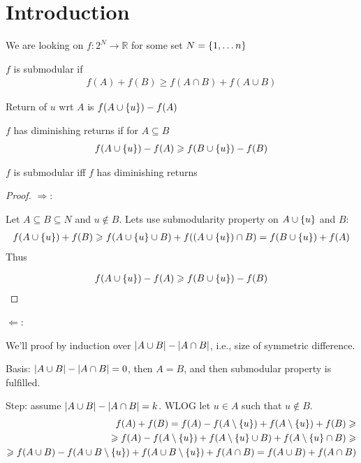 \section{Introduction}
We are looking on $f: 2^N \to \mathbb{R}$ for some set $N = \qty{1, \dots n }$
\begin{definition}
	$f$ is submodular if 
	\begin{align}
	f(A)+f(B) \geqslant f(A\cap B) + f(A\cup B)
	\end{align}
\end{definition}

\begin{definition}
	Return of $u$ wrt $A$ is $f(A \cup \qty{u }) - f(A)$
	
\end{definition}
\begin{definition}
$f$ has diminishing returns if for $A\subseteq B$
\begin{align}
f(A \cup \qty{u }) - f(A) \geqslant f(B \cup \qty{u }) - f(B)
\end{align}
\end{definition}

\begin{prop}
	$f$ is submodular iff $f$ has diminishing returns
	\begin{proof}
		$\Rightarrow$:
		
		Let $A\subseteq B \subseteq N$ and $u\notin B$. Lets use submodularity property on $A\cup \qty{ u }$ and $B$:
		\begin{align}
		f(A\cup \qty{ u }) + f(B) \geqslant f\qty(A\cup \qty{ u } \cup B) + f\qty((A\cup \qty{ u }) \cap B)  = f\qty(B\cup \qty{ u }) + f(A)  
		\end{align}
		Thus
		
		\begin{align}
		f(A\cup \qty{ u })-f(A) \geqslant f\qty(B\cup \qty{ u })-f(B)
		\end{align}
	\end{proof}


$\Leftarrow$:

We'll proof by induction over $\abs{A\cup B} - \abs{A\cap B}$, i.e., size of symmetric difference.

Basis: $\abs{A\cup B} - \abs{A\cap B} = 0$, then $A=B$, and then submodular property is fulfilled.

Step: assume $\abs{A\cup B} - \abs{A\cap B} = k$. WLOG let $u\in A$ such that $u\notin B$.
\begin{align}
f(A) + f(B) = f(A) - f(A \setminus \qty{u}) + f(A \setminus  \qty{u}) + f(B) \geqslant\\\geqslant  f(A) - f(A \setminus \qty{u}) + f(A \setminus  \qty{u} \cup B) + f(A \setminus  \qty{u}  \cap B) \geqslant\\\geqslant f(A\cup B) -  f(A\cup B \setminus \qty{ u }) + f(A  \cup B \setminus  \qty{u} ) + f(A  \cap B) = f(A\cup B) + f(A\cap B)
\end{align}
\end{prop}

